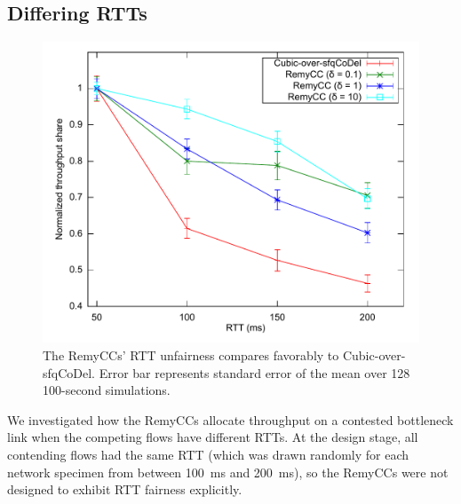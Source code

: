 %
%


%

\subsection{Differing RTTs}

\begin{figure}

\includegraphics[width=\columnwidth]{rttfairness.pdf}
\caption{The RemyCCs' RTT unfairness compares favorably to
  Cubic-over-sfqCoDel. Error bar represents standard error of the mean
  over 128 100-second simulations.}

\label{f:fairness}

\end{figure}

We investigated how the RemyCCs allocate throughput on a contested
bottleneck link when the competing flows have different RTTs. At the
design stage, all contending flows had the same RTT (which was drawn
randomly for each network specimen from between 100~ms and 200~ms), so
the RemyCCs were not designed to exhibit RTT fairness explicitly.

